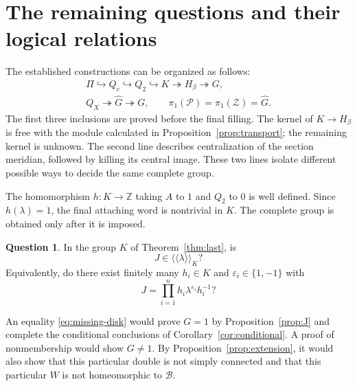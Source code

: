 \documentclass[11pt]{amsart}
\theoremstyle{definition}
\newtheorem{question}[theorem]{Question}
\theoremstyle{remark}
\newcommand{\Z}{\mathbb Z}
\newcommand{\nc}[1]{\langle\!\langle #1\rangle\!\rangle}
\newcommand{\BK}{\mathcal B}
\begin{document}
\section{The remaining questions and their logical relations}\label{sec:open}

The established constructions can be organized as follows:
\[
\begin{gathered}
 \Pi\hookrightarrow Q_c\hookrightarrow Q_2\hookrightarrow K
       \twoheadrightarrow H_\beta\twoheadrightarrow G,\\
 Q_X\twoheadrightarrow\widehat G\twoheadrightarrow G,
 \qquad \pi_1(\mathcal P)=\pi_1(\mathcal Z)=\widehat G.
\end{gathered}
\]
The first three inclusions are proved before the final filling.
The kernel of $K\to H_\beta$ is free with the module calculated
in Proposition~\ref{prop:transport}; the remaining kernel is unknown.
The second line describes centralization of the section meridian,
followed by killing its central image. These two lines isolate
different possible ways to decide the same complete group.


The homomorphism $h:K\to\Z$ taking $A$ to $1$ and $Q_2$ to
$0$ is well defined. Since $h(\lambda)=1$, the final attaching
word is nontrivial in $K$. The complete group is obtained only
after it is imposed.

\begin{question}\label{q:decisive}
In the group $K$ of Theorem~\ref{thm:last}, is
\[
                              J\in\nc{\lambda}_K?
\]
Equivalently, do there exist finitely many $h_i\in K$ and
$\varepsilon_i\in\{1,-1\}$ with
\begin{equation}\label{eq:missing-disk}
                J=\prod_{i=1}^n h_i\lambda^{\varepsilon_i}h_i^{-1}?
\end{equation}
\end{question}

An equality \eqref{eq:missing-disk} would prove $G=1$ by
Proposition~\ref{prop:J} and complete the conditional conclusions
of Corollary~\ref{cor:conditional}. A proof of nonmembership would
show $G\ne1$. By Proposition~\ref{prop:extension}, it would also
show that this particular double is not simply connected and that
this particular $W$ is not homeomorphic to $\BK$.
\end{document}
